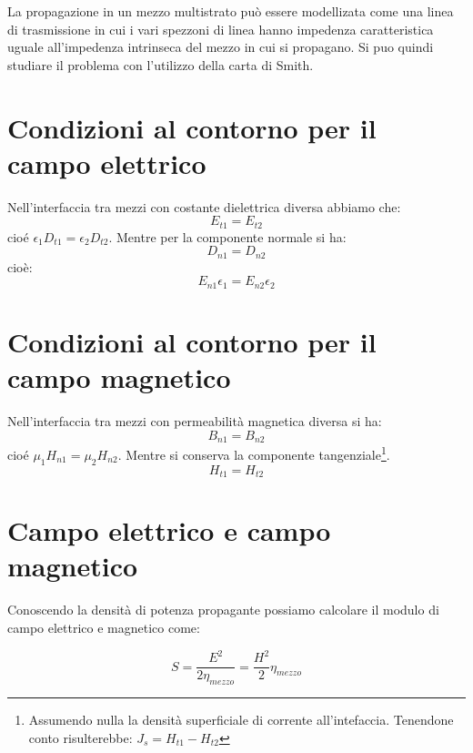 		
		La propagazione in un mezzo multistrato può essere modellizata come una linea di trasmissione in cui i vari spezzoni di linea hanno impedenza caratteristica uguale all'impedenza intrinseca del mezzo in cui si propagano.	
		Si puo quindi studiare il problema con l'utilizzo della carta di Smith.

	\section{Condizioni al contorno per il campo elettrico}

		Nell'interfaccia tra mezzi con costante dielettrica diversa abbiamo che:
		\begin{equation}
		E_{t1}=E_{t2} 
		\end{equation}
		cioé $\epsilon_1 D_{t1} = \epsilon_2 D_{t2}$.
		Mentre per la componente normale si ha:
		\begin{equation}
		D_{n1} = D_{n2}
		\end{equation}
		cioè:
		\begin{equation}
		E_{n1}\epsilon_1=E_{n2}\epsilon_2
		\end{equation}

	\section{Condizioni al contorno per il campo magnetico}
		Nell'interfaccia tra mezzi con permeabilità magnetica diversa si ha:
		\begin{equation}
		B_{n1}=B_{n2} 
		\end{equation}
		cioé $\mu_1 H_{n1} = \mu_2 H_{n2}$.
		Mentre si conserva la componente tangenziale\footnote{Assumendo nulla la densità superficiale di corrente all'intefaccia. Tenendone conto risulterebbe: $J_s=H_{t1}-H_{t2}$}.
		\begin{equation}
		H_{t1}=H_{t2}
		\end{equation}

	\section{Campo elettrico e campo magnetico}

	Conoscendo la densità di potenza propagante possiamo calcolare il modulo di campo elettrico e magnetico come:

	\begin{equation}
	S=\frac{E^2}{2\eta_{mezzo}}=\frac{H^2}{2}\eta_{mezzo}
	\end{equation}


